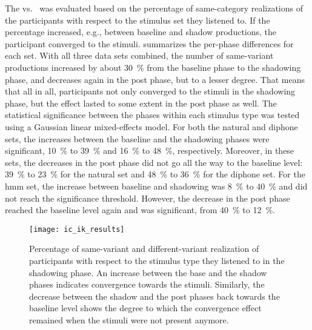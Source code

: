 The \textipa{[I\c{c}]} vs.\ \textipa{[Ik]} was evaluated based on the percentage of same-category realizations of the participants with respect to the stimulus set they listened to.
If the percentage increased, e.g., between baseline and shadow productions, the participant converged to the stimuli.
 summarizes the per-phase differences for each set.
With all three data sets combined, the number of same-variant productions increased by about \SI{30}{\percent} from the baseline phase to the shadowing phase, and decreases again in the post phase, but to a lesser degree.
That means that all in all, participants not only converged to the stimuli in the shadowing phase, but the effect lasted to some extent in the post phase as well.
The statistical significance between the phases within each stimulus type was tested using a Gaussian linear mixed-effects model.
For both the natural and diphone sets, the increases between the baseline and the shadowing phases were significant, \SI{10}{\percent} to \SI{39}{\percent} and \SI{16}{\percent} to \SI{48}{\percent}, respectively.
Moreover, in these sets, the decreases in the post phase did not go all the way to the baseline level: \SI{39}{\percent} to \SI{23}{\percent} for the natural set and \SI{48}{\percent} to \SI{36}{\percent} for the diphone set.
For the \ac{hmm} set, the increase between baseline and shadowing was \SI{8}{\percent} to \SI{40}{\percent} and did not reach the significance threshold.
However, the decrease in the post phase reached the baseline level again and was significant, from \SI{40}{\percent} to \SI{12}{\percent}.
%
\begin{figure}[t]
	\centering
	\texttt{[image: ic\_ik\_results]}
	\caption[Convergence results for \textipa{[I\c{c}]} vs.\ \textipa{[Ik]} with three stimuli sets]
		{Percentage of same-variant and different-variant realization of participants with respect to the stimulus type they listened to in the shadowing phase.
		An increase between the base and the shadow phases indicates convergence towards the stimuli.
		Similarly, the decrease between the shadow and the post phases back towards the baseline level shows the degree to which the convergence effect remained when the stimuli were not present anymore.}
	\label{fig:ic_ik_results}
\end{figure}
%

